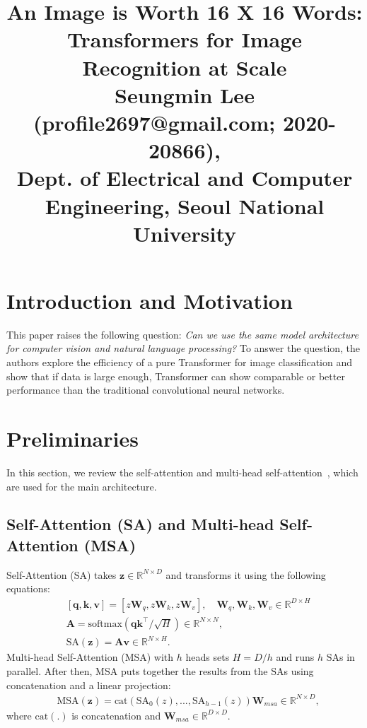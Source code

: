 \documentclass[10pt,twocolumn,letterpaper]{article}
\begin{document}
\title{An Image is Worth 16 X 16 Words: Transformers for Image Recognition at Scale\\ {\rm {\normalsize Seungmin Lee (profile2697@gmail.com; 2020-20866), \\Dept. of Electrical and Computer Engineering, Seoul National University}}}   %

\maketitle
\thispagestyle{empty}

\section{Introduction and Motivation}
This paper raises the following question: \textit{Can we use the same model architecture for computer vision and natural language processing?} To answer the question, the authors explore the efficiency of a pure Transformer for image classification and show that if data is large enough, Transformer can show comparable or better performance than the traditional convolutional neural networks. 


\section{Preliminaries}
In this section, we review the self-attention and multi-head self-attention~\cite{SA}, which are used for the main architecture.
\subsection{Self-Attention (SA) and Multi-head Self-Attention (MSA)} 
Self-Attention (SA) takes $\mathbf{z} \in \mathbb{R}^{N \times D}$ and transforms it using the following equations:
\begin{align*}
	&[\mathbf{q}, \mathbf{k}, \mathbf{v}] = [z\mathbf{W}_q, z\mathbf{W}_k, z\mathbf{W}_v], \quad \mathbf{W}_q, \mathbf{W}_k, \mathbf{W}_v \in \mathbb{R}^{D \times H}	\\
	&\mathbf{A} = \text{softmax}(\mathbf{q}\mathbf{k}^\intercal / \sqrt{H}) \in \mathbb{R}^{N \times N}, \\
	&\text{SA}(\mathbf{z}) = \mathbf{A}\mathbf{v} \in \mathbb{R}^{N \times H}.
\end{align*}
Multi-head Self-Attention (MSA) with $h$ heads sets $H = D / h$ and runs $h$ $\text{SA}$s in parallel. After then, MSA puts together the results from the $\text{SA}$s using concatenation and a linear projection:
\begin{align*}
	&\text{MSA}(\mathbf{z}) = \text{cat}(\text{SA}_0(z), ..., \text{SA}_{h-1}(z))\mathbf{W}_{msa} \in \mathbb{R}^{N \times D},
\end{align*}
where $\text{cat}(.)$ is concatenation and $\mathbf{W}_{msa} \in \mathbb{R}^{D \times D}$.
\end{document}
